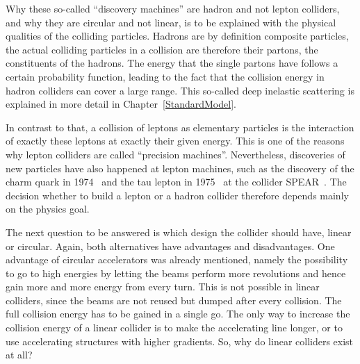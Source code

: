 Why these so-called ``discovery machines'' are hadron and not lepton colliders, and why they are circular and not linear, is to be explained with the physical qualities of the colliding particles.
Hadrons are by definition composite particles, the actual colliding particles in a collision are therefore their partons, the constituents of the hadrons.
The energy that the single partons have follows a certain probability function, leading to the fact that the collision energy in hadron colliders can cover a large range.
This so-called deep inelastic scattering is explained in more detail in Chapter~\ref{StandardModel}.

In contrast to that, a collision of leptons as elementary particles is the interaction of exactly these leptons at exactly their given energy.
This is one of the reasons why lepton colliders are called ``precision machines''.
Nevertheless, discoveries of new particles have also happened at lepton machines, such as the discovery of the charm quark in 1974~\cite{charm} and the tau lepton in 1975~\cite{tau} at the \positron\electron collider SPEAR~\cite{SPEAR}.
The decision whether to build a lepton or a hadron collider therefore depends mainly on the physics goal.

The next question to be answered is which design the collider should have, linear or circular.
Again, both alternatives have advantages and disadvantages.
One advantage of circular accelerators was already mentioned, namely the possibility to go to high energies by letting the beams perform more revolutions and hence gain more and more energy from every turn.
This is not possible in linear colliders, since the beams are not reused but dumped after every collision.
The full collision energy has to be gained in a single go.
The only way to increase the collision energy of a linear collider is to make the accelerating line longer, or to use accelerating structures with higher gradients.
So, why do linear colliders exist at all?


